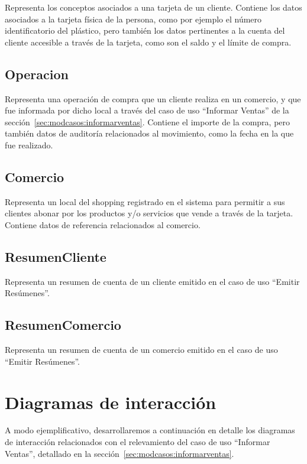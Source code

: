 Representa los conceptos asociados a una tarjeta de un cliente. Contiene los 
datos asociados a la tarjeta física de la persona, como por ejemplo el número
identificatorio del plástico, pero también los datos pertinentes a la cuenta 
del cliente accesible a través de la tarjeta, como son el saldo y el límite de
compra.

\subsection{Operacion}

Representa una operación de compra que un cliente realiza en un comercio, y que
fue informada por dicho local a través del caso de uso ``Informar Ventas'' de 
la sección~\ref{sec:modcasos:informarventas}. Contiene el importe de la compra,
pero también datos de auditoría relacionados al movimiento, como la fecha en la
que fue realizado.

\subsection{Comercio}

Representa un local del shopping registrado en el sistema para permitir a sus
clientes abonar por los productos y/o servicios que vende a través de la 
tarjeta. Contiene datos de referencia relacionados al comercio.

\subsection{ResumenCliente}

Representa un resumen de cuenta de un cliente emitido en el caso de uso 
``Emitir Resúmenes''. 

\subsection{ResumenComercio}

Representa un resumen de cuenta de un comercio emitido en el caso de uso
``Emitir Resúmenes''. 

\section{Diagramas de interacción}

A modo ejemplificativo, desarrollaremos a continuación en detalle los 
diagramas de interacción relacionados con el relevamiento del caso de uso
``Informar Ventas'', detallado en la sección~\ref{sec:modcasos:informarventas}.

